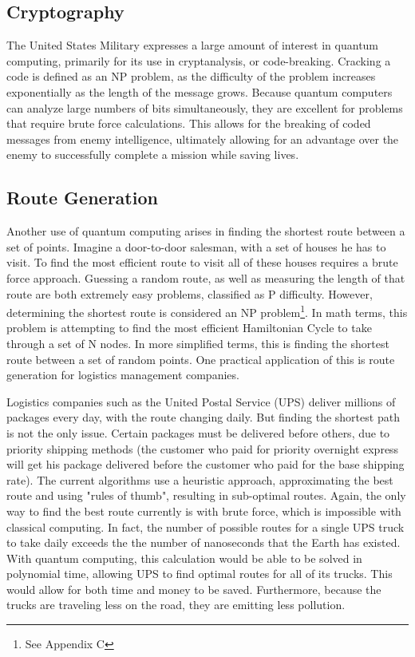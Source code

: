 \documentclass[10pt,journal,compsoc]{IEEEtran}
\begin{document}
\subsection{Cryptography}
The United States Military expresses a large amount of interest in quantum computing, primarily for its use in cryptanalysis, or code-breaking. Cracking a code is defined as an NP problem, as the difficulty of the problem increases exponentially as the length of the message grows. Because quantum computers can analyze large numbers of bits simultaneously, they are excellent for problems that require brute force calculations. This allows for the breaking of coded messages from enemy intelligence, ultimately allowing for an advantage over the enemy to successfully complete a mission while saving lives. 

\subsection{Route Generation}
Another use of quantum computing arises in finding the shortest route between a set of points. Imagine a door-to-door salesman, with a set of houses he has to visit. To find the most efficient route to visit all of these houses requires a brute force approach. Guessing a random route, as well as measuring the length of that route are both extremely easy problems, classified as P difficulty. However, determining the shortest route is considered an NP problem\footnote{See Appendix C }.
In math terms, this problem is attempting to find the most efficient Hamiltonian Cycle to take through a set of N nodes. In more simplified terms, this is finding the shortest route between a set of random points. One practical application of this is route generation for logistics management companies. 

Logistics companies such as the United Postal Service (UPS) deliver millions of packages every day, with the route changing daily. But finding the shortest path is not the only issue. Certain packages must be delivered before others, due to priority shipping methods (the customer who paid for priority overnight express will get his package delivered before the customer who paid for the base shipping rate). The current algorithms use a heuristic approach, approximating the best route and using "rules of thumb", resulting in sub-optimal routes. Again, the only way to find the best route currently is with brute force, which is impossible with classical computing. In fact, the number of possible routes for a single UPS truck to take daily exceeds the the number of nanoseconds that the Earth has existed\cite{Fast}. With quantum computing, this calculation would be able to be solved in polynomial time, allowing UPS to find optimal routes for all of its trucks. This would allow for both time and money to be saved. Furthermore, because the trucks are traveling less on the road, they are emitting less pollution. 
\end{document}
